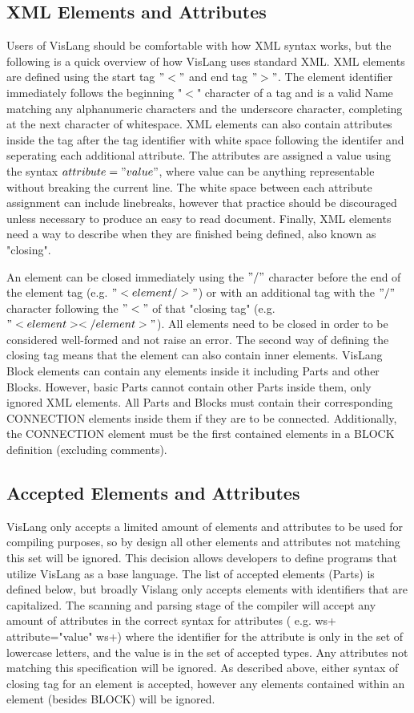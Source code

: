 \subsection{XML Elements and Attributes}
Users of VisLang should be comfortable with how XML syntax works, but the following is a quick overview of how VisLang uses standard XML.
XML elements are defined using the start tag $"<"$ and end tag $">"$.
The element identifier immediately follows the beginning "$<$" character of a tag and is a valid Name matching any alphanumeric characters and the underscore character, completing at the next character of whitespace.
XML elements can also contain attributes inside the tag after the tag identifier with white space following the identifer and seperating each additional attribute.
The attributes are assigned a value using the syntax $attribute="value"$, where value can be anything representable without breaking the current line.
The white space between each attribute assignment can include linebreaks, however that practice should be discouraged unless necessary to produce an easy to read document.
Finally, XML elements need a way to describe when they are finished being defined, also known as "closing".
\par
An element can be closed immediately using the $"/"$ character before the end of the element tag (e.g. $"<element/>"$) or with an additional tag with the $"/"$ character following the $"<"$ of that "closing tag" (e.g. $"<element></element>"$).
All elements need to be closed in order to be considered well-formed and not raise an error.
The second way of defining the closing tag means that the element can also contain inner elements.
VisLang Block elements can contain any elements inside it including Parts and other Blocks.
However, basic Parts cannot contain other Parts inside them, only ignored XML elements.
All Parts and Blocks must contain their corresponding CONNECTION elements inside them if they are to be connected.
Additionally, the CONNECTION element must be the first contained elements in a BLOCK definition (excluding comments).
\subsection{Accepted Elements and Attributes}
VisLang only accepts a limited amount of elements and attributes to be used for compiling purposes, so by design all other elements and attributes not matching this set will be ignored.
This decision allows developers to define programs that utilize VisLang as a base language.
The list of accepted elements (Parts) is defined below, but broadly Vislang only accepts elements with identifiers that are capitalized.
The scanning and parsing stage of the compiler will accept any amount of attributes in the correct syntax for attributes ( e.g.
ws+ attribute="value" ws+) where the identifier for the attribute is only in the set of lowercase letters, and the value is in the set of accepted types.
Any attributes not matching this specification will be ignored.
As described above, either syntax of closing tag for an element is accepted, however any elements contained within an element (besides BLOCK) will be ignored.
